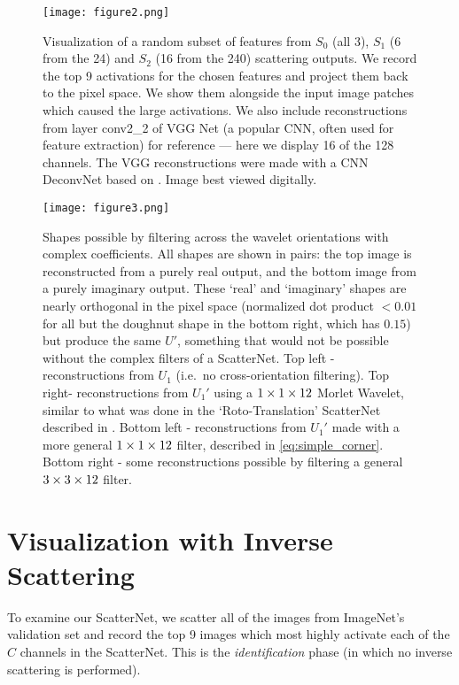 \begin{figure*}[htp]
  \centering
  \texttt{[image: figure2.png]}
  \caption{Visualization of a random subset of features from $S_0$ (all
  3), $S_1$ (6 from the 24) and $S_2$ (16 from the 240) scattering
    outputs. We record the top 9 activations for the chosen features and project
    them back to the pixel space. We show them alongside the input image patches
    which caused the large activations. We also include reconstructions from
    layer conv2\_2 of VGG Net \cite{simonyan_very_2014}(a popular CNN, often used
    for feature extraction) for reference --- here we display 16 of the 128
    channels. The VGG reconstructions were made with a CNN DeconvNet based on
    \cite{zeiler_visualizing_2014}. Image best viewed digitally.}
  \label{fig:reconstructions}
\end{figure*}
\begin{figure*}[t]
  \centering
  \texttt{[image: figure3.png]}
  \caption{Shapes possible by filtering across the wavelet orientations with
  complex coefficients. All shapes are shown
  in pairs: the top image is reconstructed from a purely real output, and the
  bottom image from a purely imaginary output. These `real' and `imaginary' shapes 
  are nearly orthogonal in the pixel space (normalized dot product $<0.01$ for
  all but the doughnut shape in the bottom right, which has $0.15$) but produce
  the same $U'$, something that would not be possible without the complex
  filters of a ScatterNet.  Top left - reconstructions from $U_1$ (i.e.\ no
  cross-orientation filtering). Top right- reconstructions from $U_1'$ using
  a $1\times 1\times 12$ Morlet Wavelet, similar to what was done in the `Roto-Translation'
  ScatterNet described in \cite{sifre_rotation_2013, oyallon_deep_2015}. Bottom
  left - reconstructions from $U_1'$ made with a more general $1\times 1\times 12$
  filter, described in \autoref{eq:simple_corner}. Bottom
  right - some reconstructions possible by filtering a general $3\times 3\times 12$ filter. }
  \label{fig:newshapes}
\end{figure*}

\section{Visualization with Inverse Scattering}
\label{sec:visualization}

To examine our ScatterNet, we scatter all of the images from ImageNet's validation
set and record the top 9 images which most highly activate each of the $C$
channels in the ScatterNet. This is the \emph{identification} phase (in which no
inverse scattering is performed). 

